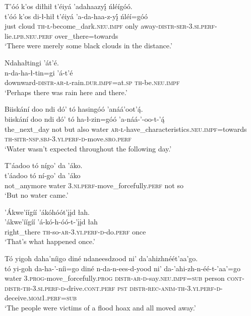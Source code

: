 \ea\label{ex:text6-13-15}
T’óó k’os diłhił t’éiyá ’adahaazyį́ ńléígóó.\\
\gll t’óó	k’os	di-ł-hił	t’éiyá	’a-da-haa-z-yį́	ńléí=góó\\
     just	cloud	\textsc{th}-\textsc{ł}-become\_dark.\textsc{neu}.\textsc{impf}	only	away-\textsc{distr}-\textsc{ser}-3.\textsc{si}.\textsc{perf}-lie.\textsc{lpb}.\textsc{neu}.\textsc{perf}	over\_there=towards\\
\glt `There were merely some black clouds in the distance.'
\z

\ea\label{ex:text6-13-16}
Ndahałtingi ’át’é.\\
\gll n-da-ha-ł-tin=gi	’á-t’é\\
     downward-\textsc{distr}-\textsc{ar}-\textsc{ł}-rain.\textsc{dur}.\textsc{impf}=at.\textsc{sp}	\textsc{th}-be.\textsc{neu}.\textsc{impf}\\
\glt `Perhaps there was rain here and there.'
\z

\ea\label{ex:text6-13-17}
Biiskání doo ndi dó’ tó hasingóó ’anáá’oot’ą́.\\
\gll biiskání	doo	ndi	dó’	tó	ha-ł-zin=góó	’a-náá-’-oo-t-’ą́\\
     the\_next\_day	not	but	also	water	\textsc{ar}-\textsc{ł}-have\_characteristics.\textsc{neu}.\textsc{impf}=towards	\textsc{th}-\textsc{sitr}-\textsc{nsp}.\textsc{sbj}-3.\textsc{yi}.\textsc{perf}-\textsc{d}-move.\textsc{sro}.\textsc{perf}\\
\glt `Water wasn't expected throughout the following day.'
\z

\ea\label{ex:text6-13-18}
T’áadoo tó nígo’ da ’áko.\\
\gll t’áadoo	tó	ní-go’	da	’áko\\
     not\_anymore	water	3.\textsc{ni}.\textsc{perf}-move\_forcefully.\textsc{perf}	not	so\\
\glt `But no water came.'
\z

\ea\label{ex:text6-13-19}
’Ákwe’íígíí ’ákóhóót’įįd łah.\\
\gll ’ákwe’íígíí	’á-kó-h-óó-t-’įįd	łah\\
     right\_there	\textsc{th}-so-\textsc{ar}-3.\textsc{yi}.\textsc{perf}-\textsc{d}-do.\textsc{perf}	once\\
\glt `That's what happened once.'
\z

\ea\label{ex:text6-13-20}
Tó yigoh daha’níigo diné ndaneesdzood ni’ da’ahizhnéét’aa’go.\\
\gll tó	yi-goh	da-ha-’-níi=go	diné	n-da-n-ees-d-yood	ni’	da-’ahi-zh-n-éé-t-’aa’=go\\
     water	3.\textsc{prog}-move\_forcefully.\textsc{prog}	\textsc{distr}-\textsc{ar}-\textsc{d}-say.\textsc{neu}.\textsc{impf}=\textsc{sub}	person	\textsc{cont}-\textsc{distr}-\textsc{th}-3.\textsc{si}.\textsc{perf}-\textsc{d}-drive.\textsc{cont}.\textsc{perf}	\textsc{pst}	\textsc{distr}-\textsc{rec}-\textsc{anim}-\textsc{th}-3.\textsc{yi}.\textsc{perf}-\textsc{d}-deceive.\textsc{mom}1.\textsc{perf}=\textsc{sub}\\
\glt `The people were victims of a flood hoax and all moved away.'
\z

